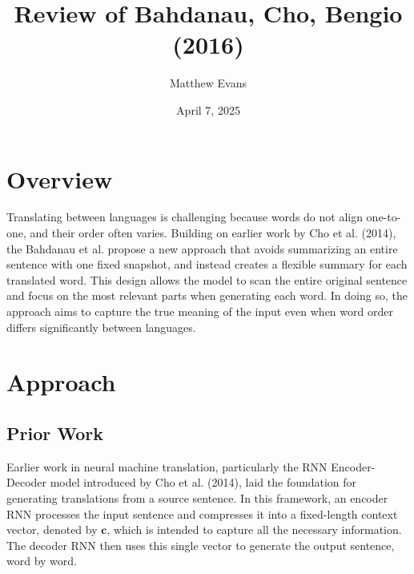 \documentclass[10pt]{article}
\title{
    Review of Bahdanau, Cho, Bengio (2016) \\
}
\author{Matthew Evans}
\date{April 7, 2025}
\begin{document}
\maketitle

\section*{Overview}
Translating between languages is challenging because words do not align one-to-one, and their order often varies. Building on earlier work by Cho et al. (2014)\cite{cho2014}, the Bahdanau et al. propose a new approach\cite{bahdanau2016} that avoids summarizing an entire sentence with one fixed snapshot, and instead creates a flexible summary for each translated word. This design allows the model to scan the entire original sentence and focus on the most relevant parts when generating each word. In doing so, the approach aims to capture the true meaning of the input even when word order differs significantly between languages.



\section*{Approach}
\subsection*{Prior Work}
Earlier work in neural machine translation, particularly the RNN Encoder-Decoder model introduced by Cho et al. (2014), laid the foundation for generating translations from a source sentence. In this framework, an encoder RNN processes the input sentence and compresses it into a fixed-length context vector, denoted by $\mathbf{c}$, which is intended to capture all the necessary information. The decoder RNN then uses this single vector to generate the output sentence, word by word.
\end{document}
